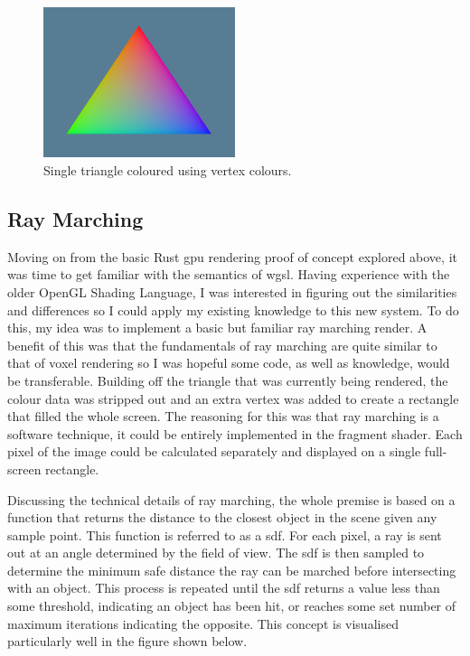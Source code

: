 \documentclass[titlepage]{article}
\begin{document}
\begin{figure}[htp]
    \centering
    \includegraphics[width=0.5\textwidth]{coloured_triangle.png}
    \caption{Single triangle coloured using vertex colours.}
\end{figure}
\FloatBarrier

\subsection{Ray Marching}
Moving on from the basic Rust \acrshort{gpu} rendering proof of concept explored above, it was time to get familiar with the semantics of \acrshort{wgsl}. Having experience with the older OpenGL Shading Language, I was interested in figuring out the similarities and differences so I could apply my existing knowledge to this new system. To do this, my idea was to implement a basic but familiar ray marching render. A benefit of this was that the fundamentals of ray marching are quite similar to that of voxel rendering so I was hopeful some code, as well as knowledge, would be transferable. Building off the triangle that was currently being rendered, the colour data was stripped out and an extra vertex was added to create a rectangle that filled the whole screen. The reasoning for this was that ray marching is a software technique, it could be entirely implemented in the fragment shader. Each pixel of the image could be calculated separately and displayed on a single full-screen rectangle.

Discussing the technical details of ray marching, the whole premise is based on a function that returns the distance to the closest object in the scene given any sample point. This function is referred to as a \acrfull{sdf}. For each pixel, a ray is sent out at an angle determined by the field of view. The \acrshort{sdf} is then sampled to determine the minimum safe distance the ray can be marched before intersecting with an object. This process is repeated until the \acrshort{sdf} returns a value less than some threshold, indicating an object has been hit, or reaches some set number of maximum iterations indicating the opposite. This concept is visualised particularly well in the figure shown below.
\end{document}
